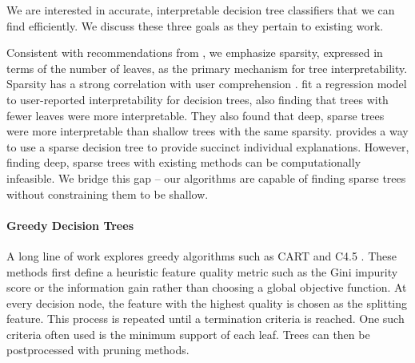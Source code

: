 We are interested in accurate, interpretable decision tree classifiers that we can find efficiently. We discuss these three goals as they pertain to existing work. 

Consistent with recommendations from \citet{rudin2022interpretable, costa2023recent}, we emphasize sparsity, expressed in terms of the number of leaves, as the primary mechanism for tree interpretability. Sparsity has a strong correlation with user comprehension \citep{Piltaver2016Comprehensible}.
\citet{zhou2018measuring} fit a regression model to user-reported interpretability for decision trees, also finding that trees with fewer leaves were more interpretable. They also found that deep, sparse trees were more interpretable than shallow trees with the same sparsity. \citet{izza2022tackling} provides a way to use a sparse decision tree to provide succinct individual explanations. However, finding deep, sparse trees with existing methods can be computationally infeasible. We bridge this gap -- our algorithms are capable of finding sparse trees without constraining them to be shallow.

\paragraph{Greedy Decision Trees}
A long line of work explores greedy algorithms such as CART \citep{breiman1984classification} and C4.5 \citep{quinlan2014c45}. These methods first define a heuristic feature quality metric such as the Gini impurity score \citep{breiman1984classification} or the information gain \citep{quinlan2014c45} rather than choosing a global objective function. At every decision node, the feature with the highest quality is chosen as the splitting feature. This process is repeated until a termination criteria is reached. One such criteria often used is the minimum support of each leaf. Trees can then be postprocessed with pruning methods.
